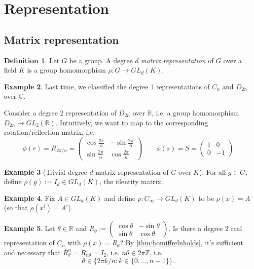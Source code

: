 \documentclass{article}
\newcommand{\Z}{\mathbb{Z}}
\newcommand{\R}{\mathbb{R}}
\newcommand{\C}{\mathbb{C}}
\theoremstyle{definition}
\newtheorem{defn}{Definition}[subsection]
\newtheorem{example}[defn]{Example}
\begin{document}
\section{Representation}
\subsection{Matrix representation}
\begin{defn}
Let $G$ be a group. A degree $d$ \textit{matrix representation} of $G$ over a field $K$ is a group homomorphism $\rho:G\rightarrow GL_d(K)$.
\end{defn}
\begin{example}
\label{example:D2n->GL2R}
Last time, we classified the degree 1 representations of $C_n$ and $D_{2n}$ over $\C$.

Consider a degree 2 representation of $D_{2n}$ over $\R$, i.e. a group homomorphism $D_{2n}\rightarrow GL_2(\R)$. Intuitively, we want to map to the corresponding rotation/reflection matrix, i.e.
\[
\phi(r) =R_{2\pi/n}=\begin{pmatrix}
\cos \frac{2\pi}{n} & -\sin \frac{2\pi}{n}\\
\sin \frac{2\pi}{n} & \cos \frac{2\pi}{n}
\end{pmatrix} \qquad \phi(s) =S=\begin{pmatrix}
1 & 0 \\ 0 & -1
\end{pmatrix}
\]
\end{example}

\begin{example}[Trivial degree $d$ matrix representation of $G$ over $K$] For all $g\in G$, define $\rho(g):=I_d\in GL_d(K)$, the identity matrix.
\end{example}

\begin{example}
Fix $A\in GL_d(K)$ and define $\rho:C_\infty\rightarrow GL_d(K)$ to be $\rho(x)=A$ (so that $\rho(x^i)=A^i$).
\end{example}

\begin{example}
Let $\theta\in\R$ and $R_\theta:=\begin{pmatrix}
\cos \theta & -\sin \theta\\
\sin \theta & \cos \theta
\end{pmatrix}$. Is there a degree 2 real representation of $C_n$ with $\rho(x)=R_\theta$? By \ref{thm:homiffrelnholds}, it's sufficient and necessary that $R_\theta^n=R_{n\theta}=I_2$, i.e. $n\theta\in 2\pi \Z$, i.e.
\[
\theta\in\{2\pi k/n : k\in\{0,\ldots,n-1\}\}.
\]
\end{example}
\end{document}
